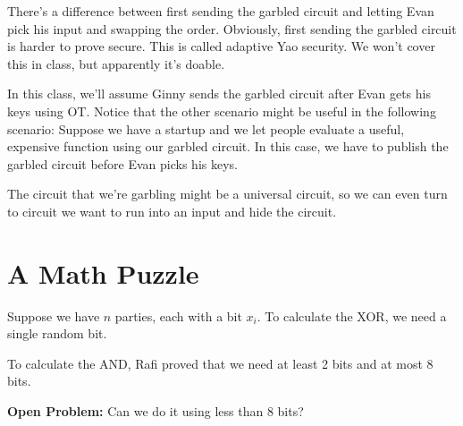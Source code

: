 \documentclass{article}
\theoremstyle{definition}
\begin{document}
There's a difference between first sending the garbled circuit and letting Evan pick his input and swapping the order. Obviously, first sending the garbled circuit is harder to prove secure. This is called adaptive Yao security. We won't cover this in class, but apparently it's doable.

In this class, we'll assume Ginny sends the garbled circuit after Evan gets his keys using OT. Notice that the other scenario might be useful in the following scenario: Suppose we have a startup and we let people evaluate a useful, expensive function using our garbled circuit. In this case, we have to publish the garbled circuit before Evan picks his keys.

The circuit that we're garbling might be a universal circuit, so we can even turn to circuit we want to run into an input and hide the circuit.

\newpage

\section{A Math Puzzle}

Suppose we have $n$ parties, each with a bit $x_{i}$. To calculate the XOR, we need a single random bit. 

To calculate the AND, Rafi proved that we need at least 2 bits and at most 8 bits. 

\textbf{Open Problem:} Can we do it using less than 8 bits?
\end{document}
